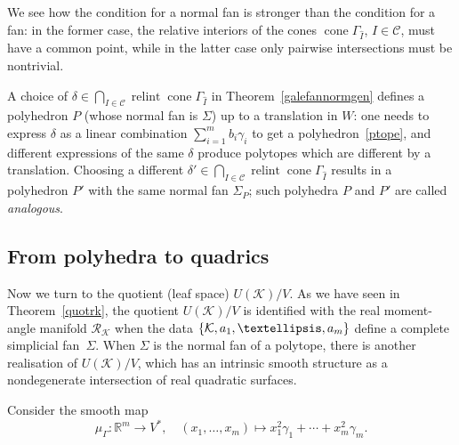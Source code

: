 \documentclass[a4paper]{amsart}
\theoremstyle{definition}
\theoremstyle{remark}
\numberwithin{equation}{section}
\def\R{\mathbb R}
\def\R{\mathbb R}
\def\sK{\mathcal K}
\newcommand{\mb}[1]{{\textbf {\textit#1}}}
\def\cone{\mathop{\mathrm{cone}}}
\def\relint{\mathop{\mathrm{relint}}}
\def\rk{\mathcal R_{\mathcal K}}
\newcommand{\<}{\langle}
\renewcommand{\>}{\rangle}
\begin{document}
We see how the condition for a normal fan is stronger than the condition for a fan: in the former case, the relative interiors of the cones $\cone\Gamma_{\widehat I}$, $I\in\mathcal C$, must have a common point, while in the latter case only pairwise intersections must be nontrivial.

A choice of $\delta\in \bigcap_{I\in\mathcal C}\relint\cone\Gamma_{\widehat I}$ in Theorem~\ref{galefannormgen} defines a polyhedron $P$ (whose normal fan is $\Sigma$) up to a translation in $W$: one needs to express $\delta$ as a linear combination $\sum_{i=1}^mb_i\gamma_i$ to get a polyhedron~\eqref{ptope}, and different expressions of the same $\delta$ produce polytopes which are different by a translation. Choosing a different $\delta'\in \bigcap_{I\in\mathcal C}\relint\cone\Gamma_{\widehat I}$ results in a polyhedron $P'$ with the same normal fan $\Sigma_P$; such polyhedra $P$ and $P'$ are called \emph{analogous}.



\subsection{From polyhedra to quadrics}\label{secqua}
Now we turn to the quotient (leaf space) $U(\sK)/V$. As we have seen in Theorem~\ref{quotrk}, the quotient $U(\sK)/V$ is identified with the real moment-angle manifold $\rk$ when the data $\{\sK,\mb a_1,\ldots,\mb a_m\}$ define a complete simplicial fan~$\Sigma$.  When $\Sigma$ is the normal fan of a polytope, there is another realisation of $U(\sK)/V$, which has an intrinsic smooth structure as a nondegenerate intersection of real quadratic surfaces.

Consider the smooth map
\[
  \mu_\Gamma\colon\R^m\to V^*, \quad (x_1,\ldots,x_m)\mapsto x^2_1\gamma_1+ 
  \cdots+x^2_m\gamma_m.
\]
\end{document}
